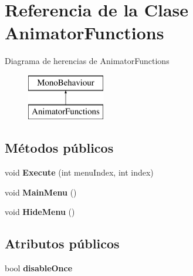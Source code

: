 \hypertarget{class_animator_functions}{}\section{Referencia de la Clase Animator\+Functions}
\label{class_animator_functions}
Diagrama de herencias de Animator\+Functions\begin{figure}[H]
\begin{center}
\leavevmode
\includegraphics[height=2.000000cm]{class_animator_functions}
\end{center}
\end{figure}
\subsection*{Métodos públicos}
\begin{DoxyCompactItemize}
\item 
\mbox{\label{class_animator_functions_a50aa001c6ad05867751979b8e7f0abf8}} 
void {\bfseries Execute} (int menu\+Index, int index)
\item 
\mbox{\label{class_animator_functions_a414db2e5825d7eeb07f8c1bc12b752eb}} 
void {\bfseries Main\+Menu} ()
\item 
\mbox{\label{class_animator_functions_a70a35e4c8e707f3ac7a9797173c38065}} 
void {\bfseries Hide\+Menu} ()
\end{DoxyCompactItemize}
\subsection*{Atributos públicos}
\begin{DoxyCompactItemize}
\item 
\mbox{\label{class_animator_functions_ae073671e7de37bce6a88df30ce177150}} 
bool {\bfseries disable\+Once}
\end{DoxyCompactItemize}
